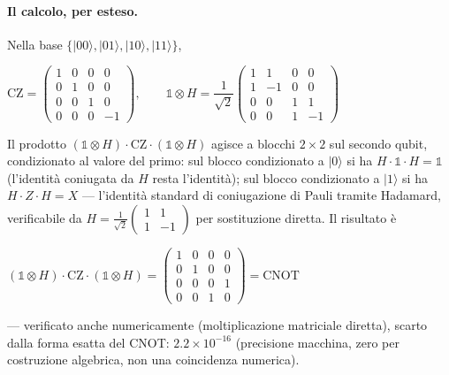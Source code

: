 \documentclass[11pt,a4paper]{article}
\newcommand{\ket}[1]{\lvert #1 \rangle}
\begin{document}
\paragraph{Il calcolo, per esteso.} Nella base
$\{\ket{00},\ket{01},\ket{10},\ket{11}\}$,
\begin{keyeq}
\centering
$\text{CZ} = \begin{pmatrix}1&0&0&0\\0&1&0&0\\0&0&1&0\\0&0&0&-1\end{pmatrix},
\qquad
\mathbb{1}\otimes H = \dfrac{1}{\sqrt2}\begin{pmatrix}1&1&0&0\\1&-1&0&0\\0&0&1&1\\0&0&1&-1\end{pmatrix}$
\end{keyeq}
Il prodotto $(\mathbb{1}\otimes H)\cdot\text{CZ}\cdot(\mathbb{1}\otimes H)$
agisce a blocchi $2\times2$ sul secondo qubit, condizionato al valore del
primo: sul blocco condizionato a $\ket0$ si ha $H\cdot\mathbb{1}\cdot H=\mathbb{1}$
(l'identità coniugata da $H$ resta l'identità); sul blocco condizionato a
$\ket1$ si ha $H\cdot Z\cdot H=X$ --- l'identità standard di coniugazione
di Pauli tramite Hadamard, verificabile da
$H=\frac{1}{\sqrt2}\begin{pmatrix}1&1\\1&-1\end{pmatrix}$ per sostituzione
diretta. Il risultato è
\begin{keyeq}
\centering
$(\mathbb{1}\otimes H)\cdot\text{CZ}\cdot(\mathbb{1}\otimes H)
= \begin{pmatrix}1&0&0&0\\0&1&0&0\\0&0&0&1\\0&0&1&0\end{pmatrix} = \text{CNOT}$
\end{keyeq}
--- verificato anche numericamente (moltiplicazione matriciale diretta),
scarto dalla forma esatta del CNOT: $2.2\times10^{-16}$ (precisione
macchina, zero per costruzione algebrica, non una coincidenza numerica).
\end{document}
